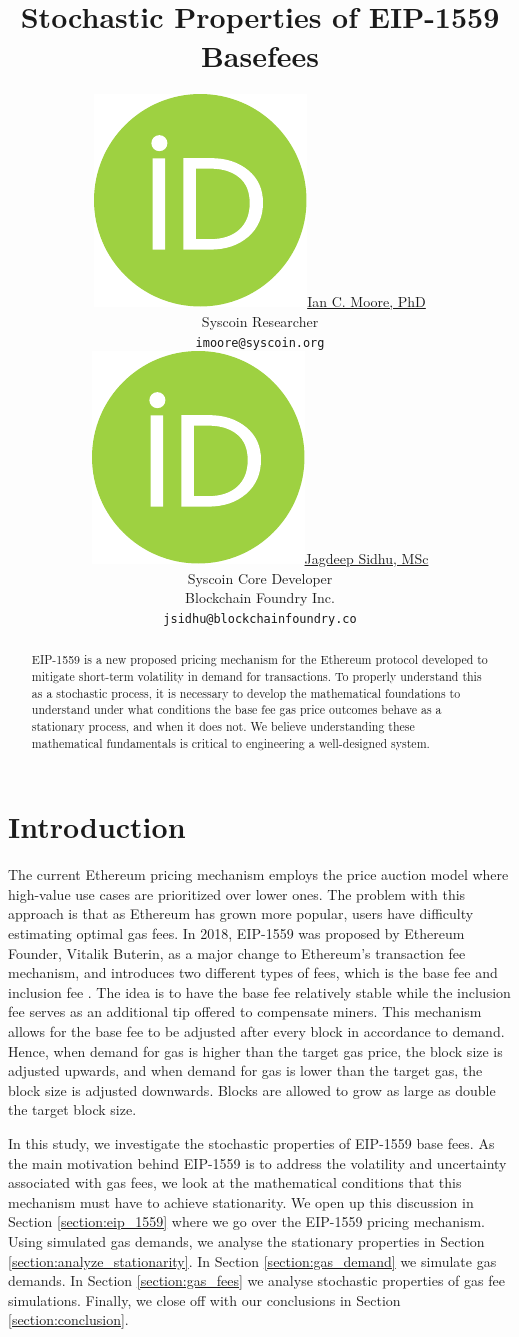 \documentclass{article}
\title{Stochastic Properties of EIP-1559 Basefees}
\author{ \href{https://orcid.org/0000-0000-0000-0000}{\includegraphics[scale=0.06]{orcid.pdf}\hspace{1mm}Ian C. Moore, PhD}\\
	Syscoin Researcher\\
	\texttt{imoore@syscoin.org} \\
	\And
	\href{https://orcid.org/0000-0000-0000-0000}{\includegraphics[scale=0.06]{orcid.pdf}\hspace{1mm}Jagdeep Sidhu, MSc} \\
	Syscoin Core Developer\\
	Blockchain Foundry Inc.\\
	\texttt{jsidhu@blockchainfoundry.co} \\
}
\begin{document}
\maketitle

\begin{abstract}
EIP-1559 is a new proposed pricing mechanism for the Ethereum protocol developed to mitigate short-term volatility in demand for transactions. To properly understand this as a stochastic process, it is necessary to develop the mathematical foundations to understand under what conditions the base fee gas price outcomes behave as a stationary process, and when it does not. We believe understanding these mathematical fundamentals is critical to engineering a well-designed system.
\end{abstract}


\section{Introduction}
The current Ethereum pricing mechanism employs the price auction model where high-value use cases are prioritized over lower ones. The problem with this approach is that as Ethereum has grown more popular, users have difficulty estimating optimal gas fees. In 2018, EIP-1559 was  proposed by Ethereum Founder, Vitalik Buterin, as a major change to Ethereum's transaction fee mechanism, and introduces two different types of fees, which is the base fee and inclusion fee \cite{But19,Rou20}. The idea is to have the base fee relatively stable while the inclusion fee serves as an additional tip offered to compensate miners. This mechanism allows for the base fee to be adjusted after every block in accordance to demand. Hence, when demand for gas is higher than the target gas price, the block size is adjusted upwards, and when demand for gas is lower than the target gas, the block size is adjusted downwards. Blocks are allowed to grow as large as double the target block size.

In this study, we investigate the stochastic properties of EIP-1559 base fees. As the main motivation behind EIP-1559 is to address the volatility and uncertainty associated with gas fees, we look at the mathematical conditions that this mechanism must have to achieve stationarity. We open up this discussion in Section \ref{section:eip_1559} where we go over the EIP-1559 pricing mechanism. Using simulated gas demands, we analyse the stationary properties in Section \ref{section:analyze_stationarity}. In Section \ref{section:gas_demand} we simulate  gas demands.  In Section \ref{section:gas_fees} we analyse stochastic properties of gas fee simulations.  Finally, we close off with our conclusions in Section \ref{section:conclusion}.
\end{document}
